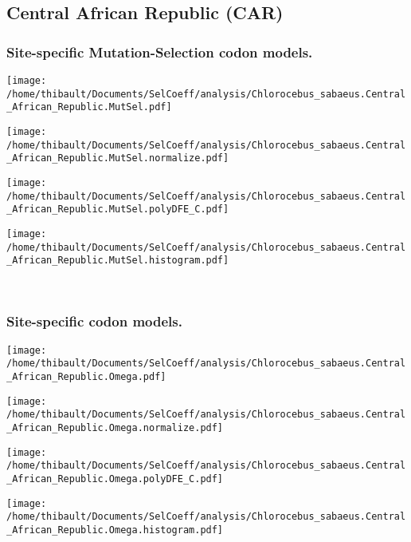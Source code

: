 \subsection{Central African Republic (CAR)} 
 
\subsubsection*{Site-specific Mutation-Selection codon models.} 
\begin{minipage}{0.49\linewidth} 
\texttt{[image: /home/thibault/Documents/SelCoeff/analysis/Chlorocebus\_sabaeus.Central\_African\_Republic.MutSel.pdf]} 
\end{minipage}
\begin{minipage}{0.49\linewidth} 
\texttt{[image: /home/thibault/Documents/SelCoeff/analysis/Chlorocebus\_sabaeus.Central\_African\_Republic.MutSel.normalize.pdf]} 
\end{minipage}
\begin{minipage}{0.49\linewidth} 
\texttt{[image: /home/thibault/Documents/SelCoeff/analysis/Chlorocebus\_sabaeus.Central\_African\_Republic.MutSel.polyDFE\_C.pdf]} 
\end{minipage}
\begin{minipage}{0.49\linewidth} 
\texttt{[image: /home/thibault/Documents/SelCoeff/analysis/Chlorocebus\_sabaeus.Central\_African\_Republic.MutSel.histogram.pdf]} 
\end{minipage}
\\ 
\subsubsection*{Site-specific codon models.} 
\begin{minipage}{0.49\linewidth} 
\texttt{[image: /home/thibault/Documents/SelCoeff/analysis/Chlorocebus\_sabaeus.Central\_African\_Republic.Omega.pdf]} 
\end{minipage}
\begin{minipage}{0.49\linewidth} 
\texttt{[image: /home/thibault/Documents/SelCoeff/analysis/Chlorocebus\_sabaeus.Central\_African\_Republic.Omega.normalize.pdf]} 
\end{minipage}
\begin{minipage}{0.49\linewidth} 
\texttt{[image: /home/thibault/Documents/SelCoeff/analysis/Chlorocebus\_sabaeus.Central\_African\_Republic.Omega.polyDFE\_C.pdf]} 
\end{minipage}
\begin{minipage}{0.49\linewidth} 
\texttt{[image: /home/thibault/Documents/SelCoeff/analysis/Chlorocebus\_sabaeus.Central\_African\_Republic.Omega.histogram.pdf]} 
\end{minipage}
\\ 
